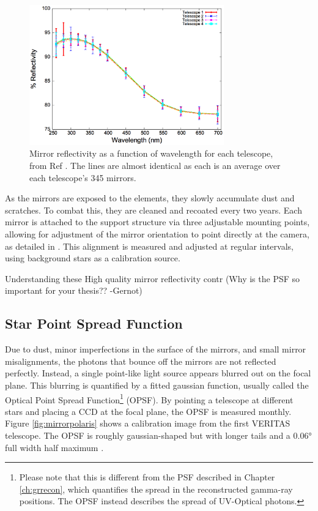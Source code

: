 \begin{figure}[ht]
  \centering
  \includegraphics[width=0.75\textwidth]{images/mirror_reflect}
  \caption[Mirror Reflectivity]{
    Mirror reflectivity as a function of wavelength for each telescope, from Ref \cite{mirrorfacets}. 
    The lines are almost identical as each is an average over each telescope's 345 mirrors.
  }
  \label{fig:mirreflect}
\end{figure}

As the mirrors are exposed to the elements, they slowly accumulate dust and scratches.
To combat this, they are cleaned and recoated every two years.
Each mirror is attached to the support structure via three adjustable mounting points, allowing for adjustment of the mirror orientation to point directly at the camera, as detailed in \cite{mirroralign}.
This alignment is measured and adjusted at regular intervals, using background stars as a calibration source.

Understanding these 
High quality mirror reflectivity contr
{\color{red}(Why is the PSF so important for your thesis?? -Gernot)}

\subsection{Star Point Spread Function}

Due to dust, minor imperfections in the surface of the mirrors, and small mirror misalignments, the photons that bounce off the mirrors are not reflected perfectly.
Instead, a single point-like light source appears blurred out on the focal plane.
This blurring is quantified by a fitted gaussian function, usually called the Optical Point Spread Function\footnote{Please note that this is different from the PSF described in Chapter \ref{ch:grrecon}, which quantifies the spread in the reconstructed gamma-ray positions.  The OPSF instead describes the spread of UV-Optical photons.} (OPSF).
By pointing a telescope at different stars and placing a CCD at the focal plane, the OPSF is measured monthly.
Figure \ref{fig:mirrorpolaris} shows a calibration image from the first VERITAS telescope.
The OPSF is roughly gaussian-shaped but with longer tails and a $ \ang{0.06} $ full width half maximum \cite{Veritas_Detector}.

